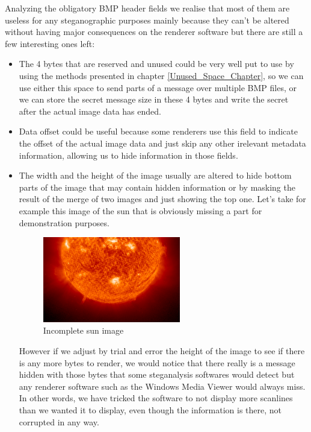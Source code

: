 Analyzing the obligatory BMP header fields we realise that most of them are useless for any steganographic purposes mainly because they can't be altered without having major consequences on the renderer software but there are still a few interesting ones left:
\begin{itemize}
  \item The 4 bytes that are reserved and unused could be very well put to use by using the methods presented in chapter \ref{Unused_Space_Chapter}, so we can use either this space to send parts of a message over multiple BMP files, or we can store the secret message size in these 4 bytes and write the secret after the actual image data has ended.
  \item Data offset could be useful because some renderers use this field to indicate the offset of the actual image data and just skip any other irelevant metadata information, allowing us to hide information in those fields.
  \item The width and the height of the image usually are altered to hide bottom parts of the image that may contain hidden information or by masking the result of the merge of two images and just showing the top one. Let's take for example this image of the sun that is obviously missing a part for demonstration purposes.

\begin{figure}[H]
    \centering
    \includegraphics[width=6cm,keepaspectratio]{pics/height_modification_steganography_cut}
    \caption{Incomplete sun image}
    \label{Sun_Missing_Part}
\end{figure}

However if we adjust by trial and error the height of the image to see if there is any more bytes to render, we would notice that there really is a message hidden with those bytes that some steganalysis softwares would detect but any renderer software such as the Windows Media Viewer would always miss. In other words, we have tricked the software to not display more scanlines than we wanted it to display, even though the information is there, not corrupted in any way.


\end{itemize}
